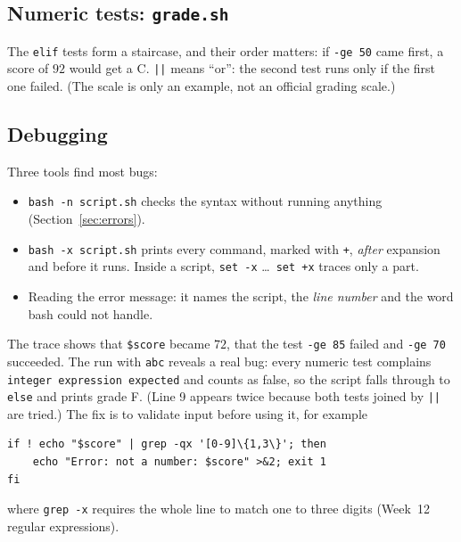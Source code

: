 \documentclass[11pt,a4paper]{article}
\newcommand{\cmd}[1]{\texttt{#1}}
\begin{document}
\subsection{Numeric tests: \texttt{grade.sh}}




The \texttt{elif} tests form a staircase, and their order matters: if \texttt{-ge 50} came first, a score of $92$ would get a C. \texttt{||} means “or”: the second test runs only if the first one failed. (The scale is only an example, not an official grading scale.)

\subsection{Debugging}
\label{sec:debug}

Three tools find most bugs:
\begin{itemize}
  \item \cmd{bash -n script.sh} checks the syntax without running anything (Section~\ref{sec:errors}).
  \item \cmd{bash -x script.sh} prints every command, marked with \texttt{+}, \emph{after} expansion and before it runs. Inside a script, \cmd{set -x} \ldots\ \cmd{set +x} traces only a part.
  \item Reading the error message: it names the script, the \emph{line number} and the word bash could not handle.
\end{itemize}


The trace shows that \texttt{\$score} became $72$, that the test \texttt{-ge 85} failed and \texttt{-ge 70} succeeded. The run with \texttt{abc} reveals a real bug: every numeric test complains \texttt{integer expression expected} and counts as false, so the script falls through to \texttt{else} and prints grade F. (Line 9 appears twice because both tests joined by \texttt{||} are tried.) The fix is to validate input before using it, for example
\begin{lstlisting}[style=sh,numbers=none]
if ! echo "$score" | grep -qx '[0-9]\{1,3\}'; then
    echo "Error: not a number: $score" >&2; exit 1
fi
\end{lstlisting}
where \cmd{grep -x} requires the whole line to match one to three digits (Week~12 regular expressions).

\end{document}
